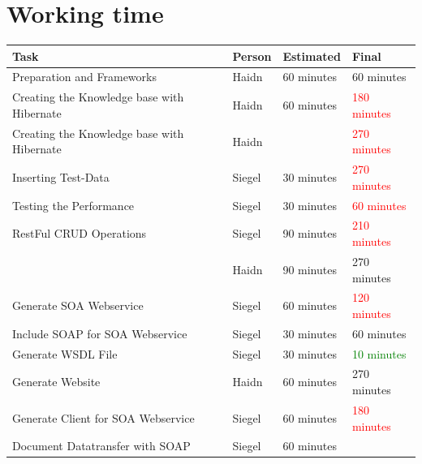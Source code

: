 \documentclass[12pt]{article}
\begin{document}
\section{Working time}
\begin{center}
\end{center}
\begin{table}[h]
\begin{tabular}{|p{}|p{}|p{}|p{}|}
\hline
\textbf{Task}    & \textbf{Person}   & \textbf{Estimated}  & \textbf{Final}\\ \hline \hline

Preparation and Frameworks & Haidn &  60 minutes & 60 minutes  \\ \hline 


Creating the Knowledge base with Hibernate & Haidn &  60   minutes & \textcolor{red}{180 minutes}
   \\ \hline 
   Creating the Knowledge base with Hibernate & Haidn &   & \textcolor{red}{270 minutes}
   \\  

Inserting Test-Data  & Siegel &  30 minutes  &   \textcolor{red}{270 minutes}  \\ \hline 

Testing the Performance  & Siegel &  30  minutes  &  \textcolor{red}{60  minutes}  \\ \hline 

RestFul CRUD Operations & Siegel &  90   minutes & \textcolor{red}{210 minutes} \\  
  & Haidn &  90 minutes  &  270   minutes  \\ \hline 


Generate SOA Webservice & Siegel &  60 minutes &  \textcolor{red}{120 minutes} \\ \hline 

Include SOAP for SOA Webservice & Siegel &  30 minutes &  60 minutes \\ \hline 
Generate WSDL File & Siegel &  30 minutes & \textcolor{green}{10 minutes}  \\ \hline 

Generate Website & Haidn &  60 minutes &  270 minutes \\ \hline 

Generate Client for SOA Webservice & Siegel &  60 minutes & \textcolor{red}{180 minutes} \\ \hline 

Document Datatransfer with SOAP & Siegel &  60 minutes &  \\ \hline 


\end{tabular}
\end{table}
\end{document}
